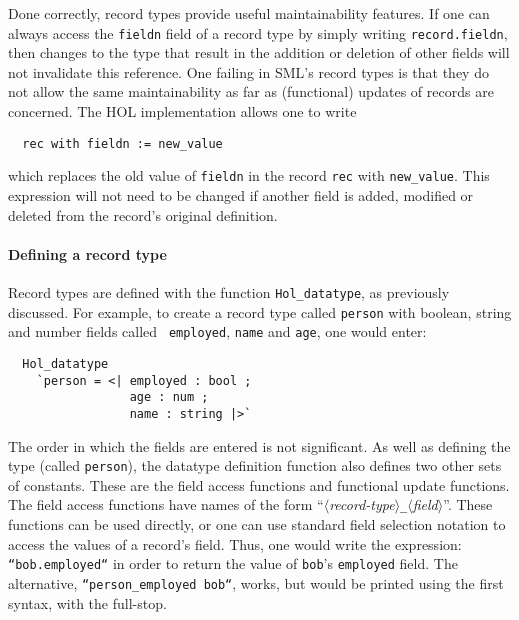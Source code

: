 Done correctly, record types provide useful maintainability features.
If one can always access the {\tt fieldn} field of a record type by
simply writing {\tt record.fieldn}, then changes to the type that
result in the addition or deletion of other fields will not invalidate
this reference.  One failing in SML's record types is that they do not
allow the same maintainability as far as (functional) updates of
records are concerned.  The HOL implementation allows one to write
\begin{hol}
\begin{verbatim}
  rec with fieldn := new_value
\end{verbatim}
\end{hol}
which replaces the old value of {\tt fieldn} in the record {\tt rec}
with {\tt new\_value}.  This expression will not need to be changed if
another field is added, modified or deleted from the record's original
definition.

\paragraph{Defining a record type}
Record types are defined with the function \texttt{Hol\_datatype}, as
previously discussed.  For example, to create a record type called
{\tt person} with boolean, string and number fields called {\tt
  employed}, {\tt name} and {\tt age}, one would enter:
\begin{hol}
\begin{verbatim}
  Hol_datatype 
    `person = <| employed : bool ; 
                 age : num ;
                 name : string |>`
\end{verbatim}
\end{hol}
The order in which the fields are entered is not significant. As well
as defining the type (called {\tt person}), the datatype definition
function also defines two other sets of constants.  These are the
field access functions and functional update functions.  The field
access functions have names of the form
``$\langle$\textsl{record-type\/}$\rangle$\verb|_|$\langle$\textsl{field\/}$\rangle$''.
These functions can be used directly, or one can use standard field
selection notation to access the values of a record's field.  Thus,
one would write the expression: \mbox{\tt ``bob.employed``} in order
to return the value of {\tt bob}'s {\tt employed} field.  The
alternative, \texttt{``person\_employed bob``}, works, but would be
printed using the first syntax, with the full-stop.

